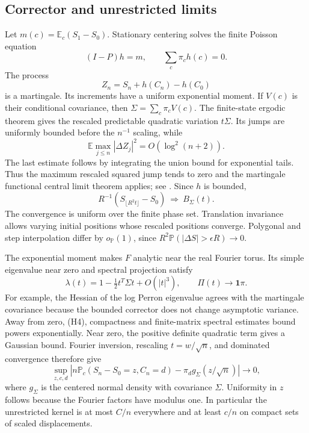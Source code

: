\documentclass[11pt,letterpaper]{article}
\numberwithin{equation}{section}
\theoremstyle{remark}\newtheorem{remark}[theorem]{Remark}
\newcommand{\PP}{\mathbb P}
\newcommand{\EE}{\mathbb E}
\newcommand{\one}{\mathbf 1}
\begin{document}
\subsection{Corrector and unrestricted limits}\label{cps:log:sec:limits}
Let $m(c)=\EE_c(S_1-S_0)$. Stationary centering solves the finite Poisson
equation
\[
 (I-P)h=m,\qquad \sum_c\pi_ch(c)=0.
\]
The process
\[
 Z_n=S_n+h(C_n)-h(C_0)
\]
is a martingale. Its increments have a uniform exponential moment. If
$V(c)$ is their conditional covariance, then
$\Sigma=\sum_c\pi_cV(c)$. The finite-state ergodic theorem gives the
rescaled predictable quadratic variation $t\Sigma$. Its jumps are
uniformly bounded before the $n^{-1}$ scaling, while
\[
 \EE\max_{j\le n}|\Delta Z_j|^2=O(\log^2(n+2)).
\]
The last estimate follows by integrating the union bound for exponential
tails. Thus the maximum rescaled squared jump tends to zero and the
martingale functional central limit theorem applies; see
\cite[Theorem 2.1(ii)]{Whitt}. Since $h$ is bounded,
\begin{equation}\label{cps:log:eq:fclt}
 R^{-1}(S_{\lfloor R^2t\rfloor}-S_0)\ \Longrightarrow\ B_\Sigma(t).
\end{equation}
The convergence is uniform over the finite phase set. Translation
invariance allows varying initial positions whose rescaled positions
converge. Polygonal and step interpolation differ by $o_{\PP}(1)$,
since $R^2\PP(|\Delta S|>\epsilon R)\to0$.

The exponential moment makes $F$ analytic near the real Fourier torus.
Its simple eigenvalue near zero and spectral projection satisfy
\[
 \lambda(t)=1-\tfrac12t^T\Sigma t+O(|t|^3),\qquad
 \Pi(t)\longrightarrow\one\pi.
\]
For example, the Hessian of the log Perron eigenvalue agrees with the
martingale covariance because the bounded corrector does not change
asymptotic variance. Away from zero, (H4), compactness and finite-matrix
spectral estimates bound powers exponentially. Near zero, the positive
definite quadratic term gives a Gaussian bound. Fourier inversion,
rescaling $t=w/\sqrt n$, and dominated convergence therefore give
\begin{equation}\label{cps:log:eq:llt}
 \sup_{z,c,d}\left|n\PP_c(S_n-S_0=z,C_n=d)
           -\pi_d g_\Sigma(z/\sqrt n)\right|\longrightarrow0,
\end{equation}
where $g_\Sigma$ is the centered normal density with covariance $\Sigma$.
Uniformity in $z$ follows because the Fourier factors have modulus one.
In particular the unrestricted kernel is at most $C/n$ everywhere and
at least $c/n$ on compact sets of scaled displacements.
\end{document}
